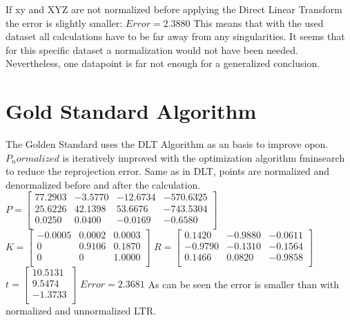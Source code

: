 \documentclass[12pt]{article}
\begin{document}
If xy and XYZ are not normalized before applying the Direct Linear Transform the error is slightly smaller:
\vspace{5mm}
\newline
$Error =    2.3880$
\vspace{5mm}
\newline
This means that with the used dataset all calculations have to be far away from any singularities. It seems that for this specific dataset a normalization would not have been needed. Nevertheless, one datapoint is far not enough for a generalized conclusion. 

\section{Gold Standard Algorithm}
The Golden Standard uses the DLT Algorithm as an basis to improve opon. $P_normalized$ is iteratively improved with the optimization algorithm fminsearch to reduce the reprojection error. Same as in DLT, points are normalized and denormalized before and after the calculation. 
\vspace{5mm}
\newline
$ P = \left[ \begin{array}{rrrr}
77.2903  & -3.5770 & -12.6734 & -570.6325 \\
25.6226  & 42.1398 &  53.6676 & -743.5304 \\
0.0250   & 0.0400  & -0.0169  & -0.6580 \\
\end{array}\right] $
\vspace{5mm}
\newline
$ K = \left[ \begin{array}{rrr}
-0.0005 &   0.0002  &  0.0003 \\
0  &  0.9106  &  0.1870 \\
0   &      0  &  1.0000 \\
\end{array}\right] $
\vspace{5mm}
\newline
$ R = \left[ \begin{array}{rrr}
0.1420  & -0.9880 &  -0.0611 \\
-0.9790  & -0.1310  & -0.1564 \\
0.1466   & 0.0820 &  -0.9858 \\
\end{array}\right] $
\vspace{5mm}
\newline
$ t = \left[ \begin{array}{r}
10.5131 \\
9.5474 \\
-1.3733 \\
\end{array}\right] $
\vspace{5mm}
\newline
$Error = 2.3681$
\vspace{5mm}
\newline
As can be seen the error is smaller than with normalized and unnormalized LTR. 
\end{document}
